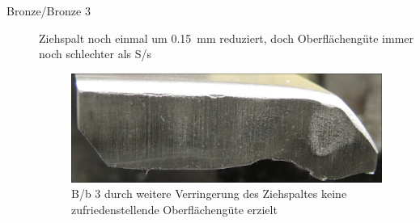 \documentclass[12pt,a4paper,parskip,twoside,BCOR5mm,headsepline]{scrartcl}
\begin{document}
\begin{description*}
\begin{description}
\item[Bronze/Bronze 3] Ziehspalt noch einmal um \SI{0.15}{\milli\meter}  reduziert, doch Oberflächengüte immer noch schlechter als S/s
\begin{figure}[H]
\centering
\includegraphics[width=.8\textwidth]{Bb3a}
\caption{B/b 3 durch weitere Verringerung des Ziehspaltes keine zufriedenstellende Oberflächengüte erzielt }
\label{fig:Bb3a}
\end{figure}




\end{description}
\end{description*}
\end{document}

